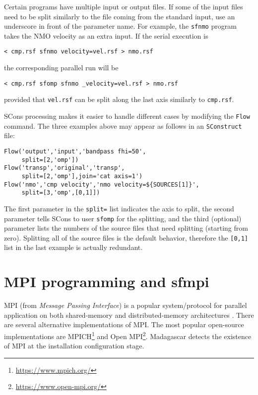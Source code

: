 Certain programs have multiple input or output files. If some of the
input files need to be split similarly to the file coming from the
standard input, use an underscore in front of the parameter name. For
example, the \texttt{sfnmo} program takes the NMO velocity as an extra
input. If the serial execution is
\begin{verbatim}
< cmp.rsf sfnmo velocity=vel.rsf > nmo.rsf
\end{verbatim}
the corresponding parallel run will be
\begin{verbatim}
< cmp.rsf sfomp sfnmo _velocity=vel.rsf > nmo.rsf
\end{verbatim}
provided that \texttt{vel.rsf} can be split along the last axis
similarly to \texttt{cmp.rsf}.

SCons processing makes it easier to handle different cases by
modifying the \texttt{Flow} command. The three examples above may
appear as follows in an \texttt{SConstruct} file:

\lstset{language=python,showstringspaces=false,frame=single}
\begin{lstlisting}
Flow('output','input','bandpass fhi=50',
     split=[2,'omp'])
Flow('transp','original','transp',
     split=[2,'omp'],join='cat axis=1')
Flow('nmo','cmp velocity','nmo velocity=${SOURCES[1]}',
     split=[3,'omp',[0,1]])
\end{lstlisting}

The first parameter in the \texttt{split=} list indicates the axis to
split, the second parameter tells SCons to user \texttt{sfomp} for the
splitting, and the third (optional) parameter lists the numbers of the
source files that need splitting (starting from zero). Splitting all
of the source files is the default behavior, therefore the
\texttt{[0,1]} list in the last example is actually redundant.

\section{MPI programming and sfmpi}

MPI (from \emph{Message Passing Interface}) is a popular
system/protocol for parallel application on both shared-memory and
distributed-memory architectures \cite[]{pacheco,gropp}. There are several alternative
implementations of MPI. The most popular open-source implementations
are MPICH\footnote{\url{https://www.mpich.org/}} and Open
MPI\footnote{\url{https://www.open-mpi.org/}}. Madagascar detects the
existence of MPI at the installation configuration stage. 

